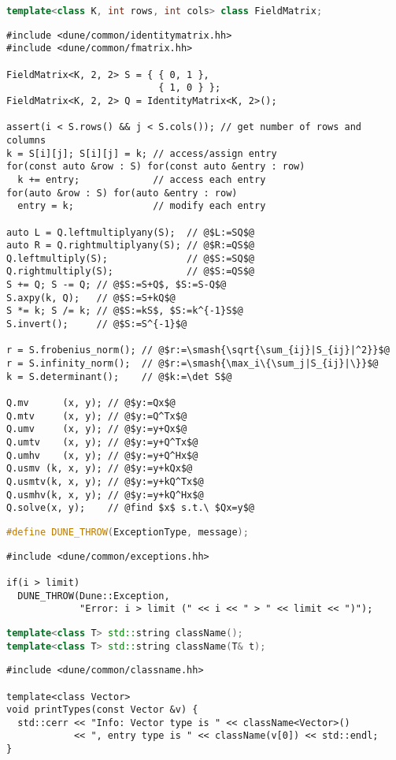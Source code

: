 \documentclass[11pt,DIV=13]{scrartcl}
\def\cxx{\lstinline[language=C++]}
\begin{document}
\cxx{template<class K, int rows, int cols> class FieldMatrix;}
\begin{lstlisting}
#include <dune/common/identitymatrix.hh>
#include <dune/common/fmatrix.hh>

FieldMatrix<K, 2, 2> S = { { 0, 1 },
                           { 1, 0 } };
FieldMatrix<K, 2, 2> Q = IdentityMatrix<K, 2>();

assert(i < S.rows() && j < S.cols()); // get number of rows and columns
k = S[i][j]; S[i][j] = k; // access/assign entry
for(const auto &row : S) for(const auto &entry : row)
  k += entry;             // access each entry
for(auto &row : S) for(auto &entry : row)
  entry = k;              // modify each entry

auto L = Q.leftmultiplyany(S);  // @$L:=SQ$@
auto R = Q.rightmultiplyany(S); // @$R:=QS$@
Q.leftmultiply(S);              // @$S:=SQ$@
Q.rightmultiply(S);             // @$S:=QS$@
S += Q; S -= Q; // @$S:=S+Q$, $S:=S-Q$@
S.axpy(k, Q);   // @$S:=S+kQ$@
S *= k; S /= k; // @$S:=kS$, $S:=k^{-1}S$@
S.invert();     // @$S:=S^{-1}$@

r = S.frobenius_norm(); // @$r:=\smash{\sqrt{\sum_{ij}|S_{ij}|^2}}$@
r = S.infinity_norm();  // @$r:=\smash{\max_i\{\sum_j|S_{ij}|\}}$@
k = S.determinant();    // @$k:=\det S$@

Q.mv      (x, y); // @$y:=Qx$@
Q.mtv     (x, y); // @$y:=Q^Tx$@
Q.umv     (x, y); // @$y:=y+Qx$@
Q.umtv    (x, y); // @$y:=y+Q^Tx$@
Q.umhv    (x, y); // @$y:=y+Q^Hx$@
Q.usmv (k, x, y); // @$y:=y+kQx$@
Q.usmtv(k, x, y); // @$y:=y+kQ^Tx$@
Q.usmhv(k, x, y); // @$y:=y+kQ^Hx$@
Q.solve(x, y);    // @find $x$ s.t.\ $Qx=y$@
\end{lstlisting}

\cxx{#define DUNE_THROW(ExceptionType, message);}
\begin{lstlisting}
#include <dune/common/exceptions.hh>

if(i > limit)
  DUNE_THROW(Dune::Exception,
             "Error: i > limit (" << i << " > " << limit << ")");
\end{lstlisting}

\cxx{template<class T> std::string className();}\\
\cxx{template<class T> std::string className(T& t);}
\begin{lstlisting}
#include <dune/common/classname.hh>

template<class Vector>
void printTypes(const Vector &v) {
  std::cerr << "Info: Vector type is " << className<Vector>()
            << ", entry type is " << className(v[0]) << std::endl;
}
\end{lstlisting}
\end{document}
